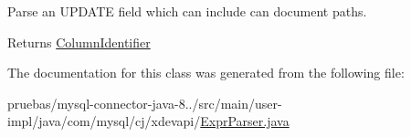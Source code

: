 Parse an U\+P\+D\+A\+TE field which can include can document paths.

\begin{DoxyReturn}{Returns}
\mbox{\hyperlink{}{Column\+Identifier}} 
\end{DoxyReturn}


The documentation for this class was generated from the following file\+:\begin{DoxyCompactItemize}
\item 
pruebas/mysql-\/connector-\/java-\/8../src/main/user-\/impl/java/com/mysql/cj/xdevapi/\mbox{\hyperlink{_expr_parser_8java}{Expr\+Parser.\+java}}\end{DoxyCompactItemize}
